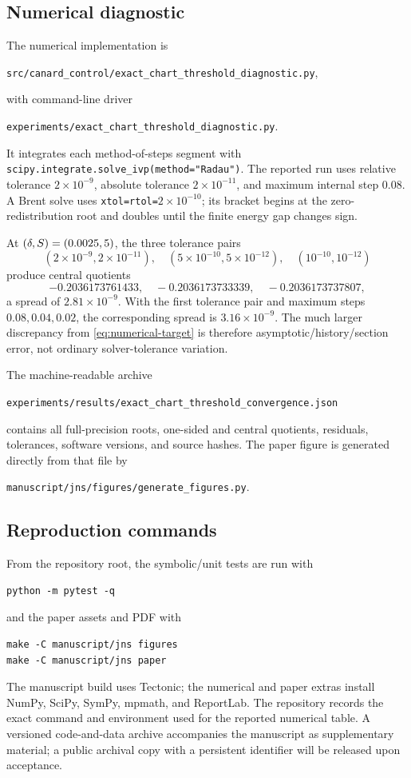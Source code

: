 \subsection{Numerical diagnostic}

The numerical implementation is
\begin{center}
\texttt{src/canard\_control/exact\_chart\_threshold\_diagnostic.py},
\end{center}
with command-line driver
\begin{center}
\texttt{experiments/exact\_chart\_threshold\_diagnostic.py}.
\end{center}
It integrates each method-of-steps segment with
\texttt{scipy.integrate.solve\_ivp(method="Radau")}.  The reported run
uses relative tolerance \(2\times10^{-9}\), absolute tolerance
\(2\times10^{-11}\), and maximum internal step \(0.08\).  A Brent solve
uses \texttt{xtol=rtol=}\(2\times10^{-10}\); its bracket begins at the
zero-redistribution root and doubles until the finite energy gap changes
sign.

At \((\delta,S)=(0.0025,5)\), the three tolerance pairs
\[
 (2\times10^{-9},2\times10^{-11}),\quad
 (5\times10^{-10},5\times10^{-12}),\quad
 (10^{-10},10^{-12})
\]
produce central quotients
\[
 -0.2036173761433,\quad
 -0.2036173733339,\quad
 -0.2036173737807,
\]
a spread of \(2.81\times10^{-9}\).  With the first tolerance pair and
maximum steps \(0.08,0.04,0.02\), the corresponding spread is
\(3.16\times10^{-9}\).  The much larger discrepancy from
\cref{eq:numerical-target} is therefore asymptotic/history/section error,
not ordinary solver-tolerance variation.

The machine-readable archive
\begin{center}
\texttt{experiments/results/exact\_chart\_threshold\_convergence.json}
\end{center}
contains all full-precision roots, one-sided and central quotients,
residuals, tolerances, software versions, and source hashes.  The paper
figure is generated directly from that file by
\begin{center}
\texttt{manuscript/jns/figures/generate\_figures.py}.
\end{center}

\subsection{Reproduction commands}

From the repository root, the symbolic/unit tests are run with
\begin{verbatim}
python -m pytest -q
\end{verbatim}
and the paper assets and PDF with
\begin{verbatim}
make -C manuscript/jns figures
make -C manuscript/jns paper
\end{verbatim}
The manuscript build uses Tectonic; the numerical and paper extras install
NumPy, SciPy, SymPy, mpmath, and ReportLab.  The repository records the exact
command and environment used for the reported numerical table.  A versioned
code-and-data archive accompanies the manuscript as supplementary material;
a public archival copy with a persistent identifier will be released upon
acceptance.
